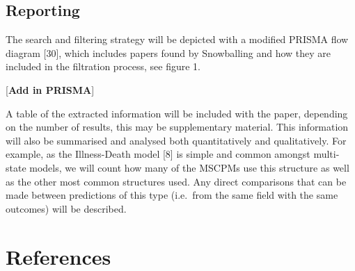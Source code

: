 \documentclass[
]{article}
\begin{document}
\hypertarget{reporting}{%
\subsection{Reporting}\label{reporting}}

The search and filtering strategy will be depicted with a modified PRISMA flow diagram {[}30{]}, which includes papers found by Snowballing and how they are included in the filtration process, see figure 1.

{[}\textbf{Add in PRISMA}{]}

A table of the extracted information will be included with the paper, depending on the number of results, this may be supplementary material. This information will also be summarised and analysed both quantitatively and qualitatively. For example, as the Illness-Death model {[}8{]} is simple and common amongst multi-state models, we will count how many of the MSCPMs use this structure as well as the other most common structures used. Any direct comparisons that can be made between predictions of this type (i.e.~from the same field with the same outcomes) will be described.

\hypertarget{references}{%
\section*{References}\label{references}}
\end{document}
